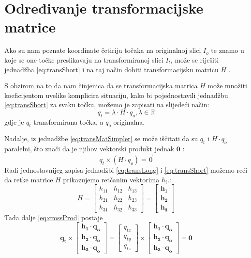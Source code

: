 \section{Određivanje transformacijske matrice}
\label{sec:odredjivanjeTransMat}

Ako su nam poznate koordinate četiriju točaka na originalnoj slici $I_o$ te znamo u koje se one točke preslikavaju na transformiranoj slici $I_t$, može se riješiti jednadžba \eqref{eq:transShort} i na taj način dobiti transformacijsku matricu $H$ \citep{segvicDinAn3D}.

S obzirom na to da nam činjenica da se transformacijska matrica $H$ može množiti koeficijentom uvelike komplicira situaciju, kako bi pojednostavili jednadžbu \eqref{eq:transShort} za svaku točku, možemo je zapisati na slijedeći način:
\begin{equation}
q_t = \lambda \cdot H \cdot q_o, \lambda \in \mathbb{R}
\label{eq:transMatSimpler}
\end{equation}
gdje je $q_t$ transformirana točka, a $q_o$ originalna.

Nadalje, iz jednadžbe \eqref{eq:transMatSimpler} se može iščitati da su $q_t$ i $H \cdot q_o$ paralelni, što znači da je njihov vektorski produkt jednak $\mathbf{0}$ \citep{vecParallel}:
\begin{equation}
\label{eq:crossProd}
q_t \times (H \cdot q_o) = \vec{0}
\end{equation}
Radi jednostavnijeg zapisa jednadžbi \eqref{eq:transLong} i \eqref{eq:transShort} možemo reći da retke matrice $H$ prikazujemo retčanim vektorima $h_i$.:
\begin{equation}
H = \left[
\begin{matrix}
h_{11} & h_{12} & h_{13} \\
h_{21} & h_{22} & h_{23} \\
h_{31} & h_{32} & h_{33}
\end{matrix}
\right]
= \left[
\begin{matrix}
\mathbf {h_1} \\
\mathbf{h_2} \\
\mathbf{h_3}
\end{matrix}
\right]
\end{equation}
Tada dalje \eqref{eq:crossProd} postaje
\begin{equation}
\label{eq:transCrossProdLong}
\mathbf{q_t} \times \left[
\begin{matrix}
\mathbf {h_1} \cdot \mathbf{q_o} \\
\mathbf{h_2} \cdot \mathbf{q_o} \\
\mathbf{h_3} \cdot \mathbf{q_o}
\end{matrix}
\right]
= \left[
\begin{matrix}
q_{tx} \\
q_{ty} \\
q_{tz}
\end{matrix}
\right]
\times \left[
\begin{matrix}
\mathbf {h_1} \cdot \mathbf{q_o} \\
\mathbf{h_2} \cdot \mathbf{q_o} \\
\mathbf{h_3} \cdot \mathbf{q_o}
\end{matrix}
\right]
= \mathbf{0}
\end{equation}

